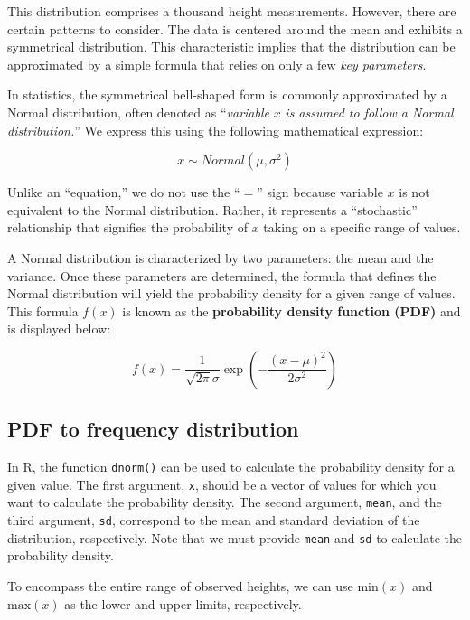 \documentclass[
]{book}
\begin{document}
This distribution comprises a thousand height measurements. However, there are certain patterns to consider. The data is centered around the mean and exhibits a symmetrical distribution. This characteristic implies that the distribution can be approximated by a simple formula that relies on only a few \emph{key parameters}.

In statistics, the symmetrical bell-shaped form is commonly approximated by a Normal distribution, often denoted as ``\emph{variable} \(x\) \emph{is assumed to follow a Normal distribution.}'' We express this using the following mathematical expression:

\[
x \sim Normal(\mu, \sigma^2)
\]

Unlike an ``equation,'' we do not use the ``\(=\)'' sign because variable \(x\) is not equivalent to the Normal distribution. Rather, it represents a ``stochastic'' relationship that signifies the probability of \(x\) taking on a specific range of values.

A Normal distribution is characterized by two parameters: the mean and the variance. Once these parameters are determined, the formula that defines the Normal distribution will yield the probability density for a given range of values. This formula \(f(x)\) is known as the \textbf{probability density function (PDF)} and is displayed below:

\[
f(x) = \frac{1}{\sqrt{2 \pi} \sigma} \exp\left(-\frac{(x-\mu)^2}{2\sigma^2}\right)
\]

\hypertarget{pdf-to-frequency-distribution}{%
\subsection{PDF to frequency distribution}\label{pdf-to-frequency-distribution}}

In R, the function \texttt{dnorm()} can be used to calculate the probability density for a given value. The first argument, \texttt{x}, should be a vector of values for which you want to calculate the probability density. The second argument, \texttt{mean}, and the third argument, \texttt{sd}, correspond to the mean and standard deviation of the distribution, respectively. Note that we must provide \texttt{mean} and \texttt{sd} to calculate the probability density.

To encompass the entire range of observed heights, we can use \(\text{min}(x)\) and \(\text{max}(x)\) as the lower and upper limits, respectively.
\end{document}
